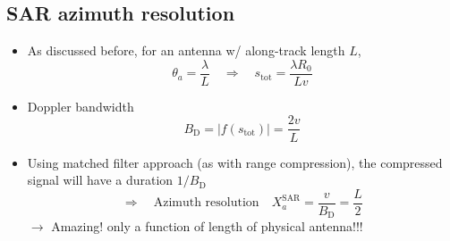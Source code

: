 \documentclass[11pt, oneside]{article}
\newcommand{\BD}{B_\mathrm{D}}
\newcommand{\stot}{s_\mathrm{tot}}
\newcommand{\XSAR}{X_a^\mathrm{SAR}}
\begin{document}
\subsection{SAR azimuth resolution}
\label{s:sarres}

\begin{itemize}
	\item As discussed before, for an antenna w/ along-track length $L$,
	\begin{equation}
		\label{e:stot}
		\theta_a = \frac{\lambda}{L} \quad\Rightarrow\quad \stot = \frac{\lambda R_0}{Lv}
	\end{equation}
	\item Doppler bandwidth
	\begin{equation}
		\label{e:BD}
		\BD = |f(\stot)| = \frac{2v}{L}
	\end{equation}
	\item Using matched filter approach (as with range compression), the compressed signal will have a duration $1/\BD$
	\begin{equation}
		\label{e:XSAR}
		\Rightarrow\quad \text{Azimuth resolution} \quad \boxed{\XSAR = \frac{v}{\BD} = \frac{L}{2}}
	\end{equation}
	\hspace*{\fill}$\rightarrow$ Amazing! only a function of length of physical antenna!!!
\end{itemize}
\end{document}
